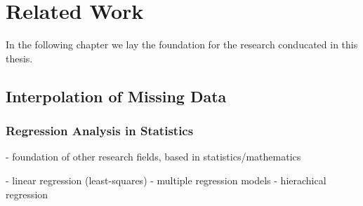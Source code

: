 \chapter{Related Work}
\label{chap:Related Work}






In the following chapter we lay the foundation for the research conducated in this thesis.

\section{Interpolation of Missing Data}


\subsection{Regression Analysis in Statistics}
- foundation of other research fields, based in statistics/mathematics

- linear regression (least-squares)
- multiple regression models
- hierachical regression

